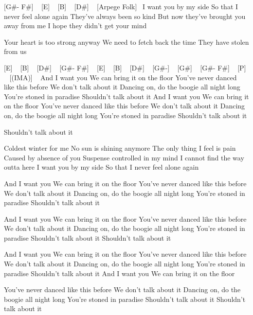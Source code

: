 [G#- F#] ~  [E] ~ [B] ~ [D#] ~
[Arpege Folk]~
I want you by my side
So that I never feel alone again
They've always been so kind
But now they've brought you away from me
I hope they didn't get your mind

Your heart is too strong anyway
We need to fetch back the time
They have stolen from us

[E] ~ [B] ~ [D#] ~ [G#- F#] ~
[E] ~ [B] ~ [D#] ~ [G#-] ~
[G#] ~ [G#- F#] ~
[P] ~ [(IMA)] ~
And I want you
We can bring it on the floor
You've never danced like this before
We don't talk about it
Dancing on, do the boogie all night long
You're stoned in paradise
Shouldn't talk about it
And I want you
We can bring it on the floor
You've never danced like this before
We don't talk about it
Dancing on, do the boogie all night long
You're stoned in paradise
Shouldn't talk about it

Shouldn't talk about it

Coldest winter for me
No sun is shining anymore
The only thing I feel is pain
Caused by absence of you
Suspense controlled in my mind
I cannot find the way outta here
I want you by my side
So that I never feel alone again

And I want you
We can bring it on the floor
You've never danced like this before
We don't talk about it
Dancing on, do the boogie all night long
You're stoned in paradise
Shouldn't talk about it

And I want you
We can bring it on the floor
You've never danced like this before
We don't talk about it
Dancing on, do the boogie all night long
You're stoned in paradise
Shouldn't talk about it
Shouldn't talk about it

And I want you
We can bring it on the floor
You've never danced like this before
We don't talk about it
Dancing on, do the boogie all night long
You're stoned in paradise
Shouldn't talk about it
And I want you
We can bring it on the floor

You've never danced like this before
We don't talk about it
Dancing on, do the boogie all night long
You're stoned in paradise
Shouldn't talk about it
Shouldn't talk about it

